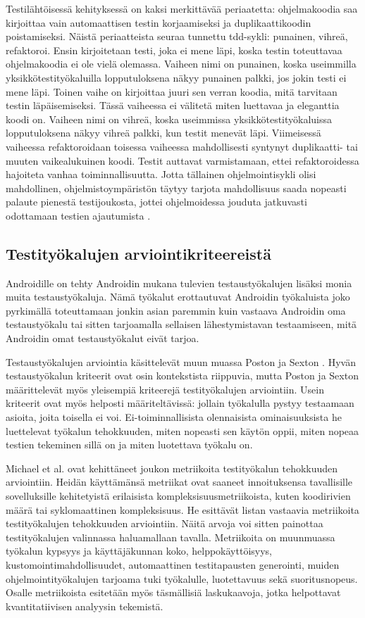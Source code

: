 Testilähtöisessä kehityksessä on kaksi merkittävää periaatetta: ohjelmakoodia saa kirjoittaa vain automaattisen testin korjaamiseksi ja duplikaattikoodin poistamiseksi. Näistä periaatteista seuraa tunnettu tdd-sykli: punainen, vihreä, refaktoroi. Ensin kirjoitetaan testi, joka ei mene läpi, koska testin toteuttavaa ohjelmakoodia ei ole vielä olemassa. Vaiheen nimi on punainen, koska useimmilla yksikkötestityökaluilla lopputuloksena näkyy punainen palkki, jos jokin testi ei mene läpi. Toinen vaihe on kirjoittaa juuri sen verran koodia, mitä tarvitaan testin läpäisemiseksi. Tässä vaiheessa ei välitetä miten luettavaa ja eleganttia koodi on. Vaiheen nimi on vihreä, koska useimmissa yksikkötestityökaluissa lopputuloksena näkyy vihreä palkki, kun testit menevät läpi. Viimeisessä vaiheessa refaktoroidaan toisessa vaiheessa mahdollisesti syntynyt duplikaatti- tai muuten vaikealukuinen koodi. Testit auttavat varmistamaan, ettei refaktoroidessa hajoiteta vanhaa toiminnallisuutta. Jotta tällainen ohjelmointisykli olisi mahdollinen, ohjelmistoympäristön täytyy tarjota mahdollisuus saada nopeasti palaute pienestä testijoukosta, jottei ohjelmoidessa jouduta jatkuvasti odottamaan testien ajautumista \cite{tdd}.

\subsection{Testityökalujen arviointikriteereistä}

Androidille on tehty Androidin mukana tulevien testaustyökalujen lisäksi monia muita testaustyökaluja. Nämä työkalut erottautuvat Androidin työkaluista joko pyrkimällä toteuttamaan jonkin asian paremmin kuin vastaava Androidin oma testaustyökalu tai sitten tarjoamalla sellaisen lähestymistavan testaamiseen, mitä Androidin omat testaustyökalut eivät tarjoa.

Testaustyökalujen arviointia käsittelevät muun muassa Poston ja Sexton \cite{poston92}. Hyvän testaustyökalun kriteerit ovat osin kontekstista riippuvia, mutta Poston ja Sexton määrittelevät myös yleisempiä kriteerejä testityökalujen arviointiin. Usein kriteerit ovat myös helposti määriteltävissä: jollain työkalulla pystyy testaamaan asioita, joita toisella ei voi. Ei-toiminnallisista olennaisista ominaisuuksista he luettelevat työkalun tehokkuuden, miten nopeasti sen käytön oppii, miten nopeaa testien tekeminen sillä on ja miten luotettava työkalu on.

Michael et al. \cite{michael02} ovat kehittäneet joukon metriikoita testityökalun tehokkuuden arviointiin. Heidän käyttämänsä metriikat ovat saaneet innoituksensa tavallisille sovelluksille kehitetyistä erilaisista kompleksisuusmetriikoista, kuten koodirivien määrä tai syklomaattinen kompleksisuus. He esittävät listan vastaavia metriikoita testityökalujen tehokkuuden arviointiin. Näitä arvoja voi sitten painottaa testityökalujen valinnassa haluamallaan tavalla. Metriikoita on muunmuassa työkalun kypsyys ja käyttäjäkunnan koko, helppokäyttöisyys, kustomointimahdollisuudet, automaattinen testitapausten generointi, muiden ohjelmointityökalujen tarjoama tuki työkalulle, luotettavuus sekä suoritusnopeus. Osalle metriikoista esitetään myös täsmällisiä laskukaavoja, jotka helpottavat kvantitatiivisen analyysin tekemistä.

